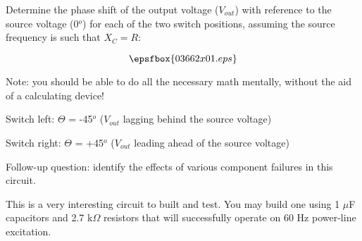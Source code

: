 

Determine the phase shift of the output voltage ($V_{out}$) with reference to the source voltage (0$^{o}$) for each of the two switch positions, assuming the source frequency is such that $X_C = R$:

$$\epsfbox{03662x01.eps}$$

Note: you should be able to do all the necessary math mentally, without the aid of a calculating device!







Switch left: $\Theta$ = -45$^{o}$ ($V_{out}$ lagging behind the source voltage)

\vskip 10pt

Switch right: $\Theta$ = +45$^{o}$ ($V_{out}$ leading ahead of the source voltage)

\vskip 10pt

Follow-up question: identify the effects of various component failures in this circuit.







This is a very interesting circuit to built and test.  You may build one using 1 $\mu$F capacitors and 2.7 k$\Omega$ resistors that will successfully operate on 60 Hz power-line excitation.




